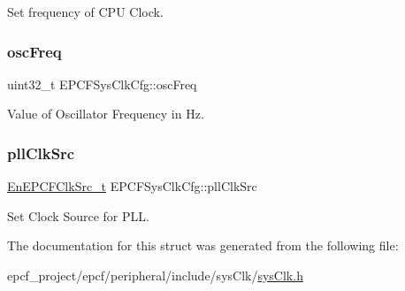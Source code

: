 Set frequency of C\+PU Clock. \mbox{\label{structEPCFSysClkCfg_a6ace7c071137554a324a16a7bb573c96}} 
\subsubsection{\texorpdfstring{osc\+Freq}{oscFreq}}
{\footnotesize\ttfamily uint32\+\_\+t E\+P\+C\+F\+Sys\+Clk\+Cfg\+::osc\+Freq}

Value of Oscillator Frequency in Hz. \mbox{\label{structEPCFSysClkCfg_a715c895d582eeb014caaaf0d02478c16}} 
\subsubsection{\texorpdfstring{pll\+Clk\+Src}{pllClkSrc}}
{\footnotesize\ttfamily \mbox{\hyperlink{sysClk_8h_ab6caeb4d5ec4b52bd42c761f88c35b4e}{En\+E\+P\+C\+F\+Clk\+Src\+\_\+t}} E\+P\+C\+F\+Sys\+Clk\+Cfg\+::pll\+Clk\+Src}

Set Clock Source for P\+LL. 

The documentation for this struct was generated from the following file\+:\begin{DoxyCompactItemize}
\item 
epcf\+\_\+project/epcf/peripheral/include/sys\+Clk/\mbox{\hyperlink{sysClk_8h}{sys\+Clk.\+h}}\end{DoxyCompactItemize}
